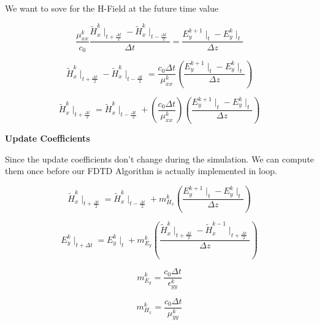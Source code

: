 \documentclass[a4paper,10pt]{article}
\begin{document}
We want to sove for the H-Field at the future time value

\begin{equation*}
  \frac{\mu_{xx}^{k}}{c_0} \frac{\tilde{H}_{x}^{k}\mid_{t+\frac  {\Delta t}{2}} - \tilde{H}_{x}^{k}\mid_{t-\frac{\Delta t}{2}}}{\Delta t} = \frac{E_{y}^{k+1}\mid_{t} - E_{y}^{k}\mid_{t}}{\Delta z}
\end{equation*}

\begin{equation*}
  \tilde{H}_{x}^{k}\mid_{t+\frac{\Delta t}{2}} - \tilde{H}_{x}^{k}\mid_{t-\frac{\Delta t}{2}} = \frac{c_0\Delta t}{\mu_{xx}^{k}}\left(\frac{E_{y}^{k+1}\mid_{t} - E_{y}^{k}\mid_{t}}{\Delta z}\right)
\end{equation*}

\begin{equation}
  \tilde{H}_{x}^{k}\mid_{t+\frac{\Delta t}{2}} = \tilde{H}_{x}^{k}\mid_{t-\frac{\Delta t}{2}} + \left(\frac{c_0\Delta t}{\mu_{xx}^{k}}\right)\left(\frac{E_{y}^{k+1}\mid_{t} - E_{y}^{k}\mid_{t}}{\Delta z}\right)
\end{equation}

\textbf{Update Coefficients}

Since the update coefficients don't change during the simulation.  We can compute them once before our FDTD Algorithm is actually implemented in loop.

\begin{equation}
  \tilde{H}_{x}^{k}\mid_{t+\frac{\Delta t}{2}} = \tilde{H}_{x}^{k}\mid_{t-\frac{\Delta t}{2}} + m_{H_x}^{k}\left(\frac{E_{y}^{k+1}\mid_{t} - E_{y}^{k}\mid_{t}}{\Delta z}\right)
\end{equation}

\begin{equation}
  E_{y}^{k}\mid_{t+\Delta t} = E_{y}^{k}\mid_{t} + m_{E_y}^{k}\left(\frac{\tilde{H}_{x}^{k}\mid_{t+\frac{\Delta t}{2}} - \tilde{H}_{x}^{k-1}\mid_{t+\frac  {\Delta t}{2}}}{\Delta z}\right)
\end{equation}


\begin{equation}
  m_{E_y}^{k} = \frac{c_0 \Delta t}{\epsilon_{yy}^{k}}
\end{equation}

\begin{equation}
   m_{H_x}^{k} = \frac{c_0 \Delta t}{\mu_{yy}^{k}}
\end{equation}
\end{document}
